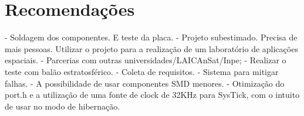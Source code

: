 \section{Recomendações}

- Soldagem dos componentes. E teste da placa.
- Projeto subestimado. Precisa de mais pessoas. Utilizar o projeto para a realização de um laboratório de aplicações espaciais. 
- Parcerias com outras universidades/LAICAnSat/Inpe;
- Realizar o teste com balão estratosférico.
- Coleta de requisitos.
- Sistema para mitigar falhas.
- A possibilidade de usar componentes SMD menores.
- Otimização do port.h e a utilização de uma fonte de clock de 32KHz para SysTick, com o intuito de usar no modo de hibernação. 



